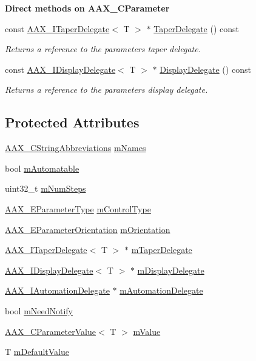 \begin{Indent}{\bf Direct methods on A\+A\+X\+\_\+\+C\+Parameter}
\begin{DoxyCompactItemize}
const \hyperlink{a00114}{A\+A\+X\+\_\+\+I\+Taper\+Delegate}$<$ T $>$ $\ast$ \hyperlink{a00033_a4cb36e3e418ee0aaa0a1ced4a4118dfb}{Taper\+Delegate} () const 
\begin{DoxyCompactList}\small\item\em Returns a reference to the parameter\textquotesingle{}s taper delegate. \end{DoxyCompactList}\item 
const \hyperlink{a00092}{A\+A\+X\+\_\+\+I\+Display\+Delegate}$<$ T $>$ $\ast$ \hyperlink{a00033_a54d1463dad6711920ad8f9287a538c9e}{Display\+Delegate} () const 
\begin{DoxyCompactList}\small\item\em Returns a reference to the parameter\textquotesingle{}s display delegate. \end{DoxyCompactList}\end{DoxyCompactItemize}
\end{Indent}
\subsection*{Protected Attributes}
\begin{DoxyCompactItemize}
\item 
\hyperlink{a00043}{A\+A\+X\+\_\+\+C\+String\+Abbreviations} \hyperlink{a00033_a13b20ef8912e57943e7c878e4d7ccc99}{m\+Names}
\item 
bool \hyperlink{a00033_af80c7fdf0e67c6e0cbd7a12f1970cd77}{m\+Automatable}
\item 
uint32\+\_\+t \hyperlink{a00033_a4502950e934f54b8db383a5349763548}{m\+Num\+Steps}
\item 
\hyperlink{a00206_a4cd0f189daa9a60cf36883c56344bb2e}{A\+A\+X\+\_\+\+E\+Parameter\+Type} \hyperlink{a00033_a117275f17ec1798506e64f5bbc3618f9}{m\+Control\+Type}
\item 
\hyperlink{a00206_a52f91d1c14aa5dceedabfb9d2de31bf0}{A\+A\+X\+\_\+\+E\+Parameter\+Orientation} \hyperlink{a00033_a0f0d01bd07e1a7ba321f23f632556145}{m\+Orientation}
\item 
\hyperlink{a00114}{A\+A\+X\+\_\+\+I\+Taper\+Delegate}$<$ T $>$ $\ast$ \hyperlink{a00033_ab2afe4e2e11cf18e4f9745fdc516ff91}{m\+Taper\+Delegate}
\item 
\hyperlink{a00092}{A\+A\+X\+\_\+\+I\+Display\+Delegate}$<$ T $>$ $\ast$ \hyperlink{a00033_af4020af64945013894851086e0bc33e2}{m\+Display\+Delegate}
\item 
\hyperlink{a00086}{A\+A\+X\+\_\+\+I\+Automation\+Delegate} $\ast$ \hyperlink{a00033_a255a10e4999648d7b0cd84909b2525ba}{m\+Automation\+Delegate}
\item 
bool \hyperlink{a00033_a3ad7bb33bf9b147a155c64455f25bf20}{m\+Need\+Notify}
\item 
\hyperlink{a00035}{A\+A\+X\+\_\+\+C\+Parameter\+Value}$<$ T $>$ \hyperlink{a00033_a039040b844bda418b110f38016757dd3}{m\+Value}
\item 
T \hyperlink{a00033_a1ecf6a063aa9c4335470cad963125ebb}{m\+Default\+Value}
\end{DoxyCompactItemize}


